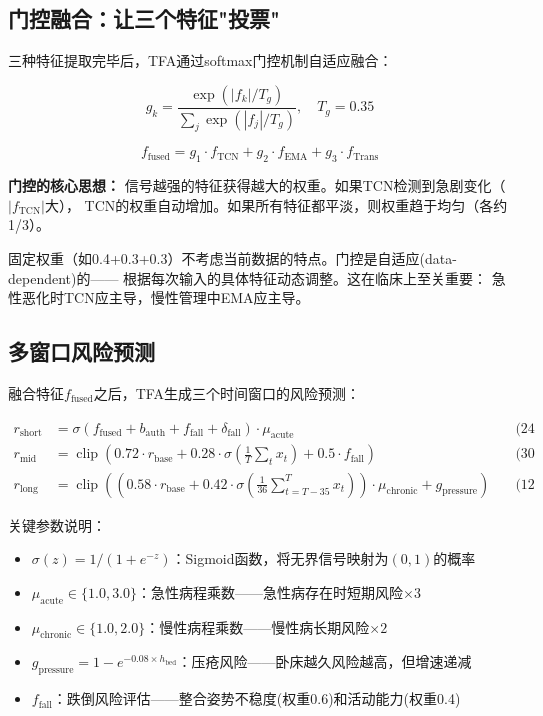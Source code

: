 \documentclass[11pt,a4paper]{ctexart}
\DeclareMathOperator{\clip}{clip}
\begin{document}
\subsection{门控融合：让三个特征"投票"}

三种特征提取完毕后，TFA通过softmax门控机制自适应融合：

$$g_k = \frac{\exp(|f_k| / T_g)}{\sum_j \exp(|f_j| / T_g)}, \quad T_g = 0.35$$

$$f_{\text{fused}} = g_1 \cdot f_{\text{TCN}} + g_2 \cdot f_{\text{EMA}} + g_3 \cdot f_{\text{Trans}}$$

\textbf{门控的核心思想：} 信号越强的特征获得越大的权重。如果TCN检测到急剧变化（$|f_{\text{TCN}}|$大），
TCN的权重自动增加。如果所有特征都平淡，则权重趋于均匀（各约1/3）。

\begin{keybox}[门控 vs 固定权重]
固定权重（如0.4+0.3+0.3）不考虑当前数据的特点。门控是自适应(data-dependent)的——
根据每次输入的具体特征动态调整。这在临床上至关重要：
急性恶化时TCN应主导，慢性管理中EMA应主导。
\end{keybox}

\subsection{多窗口风险预测}

融合特征$f_{\text{fused}}$之后，TFA生成三个时间窗口的风险预测：

\begin{align}
r_{\text{short}} &= \sigma\left(f_{\text{fused}} + b_{\text{auth}} + f_{\text{fall}} + \delta_{\text{fall}}\right) \cdot \mu_{\text{acute}} \quad &\text{(24小时)} \\
r_{\text{mid}} &= \clip\left(0.72 \cdot r_{\text{base}} + 0.28 \cdot \sigma\left(\frac{1}{T}\sum_t x_t\right) + 0.5 \cdot f_{\text{fall}}\right) \quad &\text{(30天)} \\
r_{\text{long}} &= \clip\left(\left(0.58 \cdot r_{\text{base}} + 0.42 \cdot \sigma\left(\frac{1}{36}\sum_{t=T-35}^T x_t\right)\right) \cdot \mu_{\text{chronic}} + g_{\text{pressure}}\right) \quad &\text{(12个月)}
\end{align}

关键参数说明：
\begin{itemize}[nosep]
\item $\sigma(z) = 1/(1+e^{-z})$：Sigmoid函数，将无界信号映射为$(0,1)$的概率
\item $\mu_{\text{acute}} \in \{1.0, 3.0\}$：急性病程乘数——急性病存在时短期风险$\times 3$
\item $\mu_{\text{chronic}} \in \{1.0, 2.0\}$：慢性病程乘数——慢性病长期风险$\times 2$
\item $g_{\text{pressure}} = 1 - e^{-0.08 \times h_{\text{bed}}}$：压疮风险——卧床越久风险越高，但增速递减
\item $f_{\text{fall}}$：跌倒风险评估——整合姿势不稳度(权重0.6)和活动能力(权重0.4)
\end{itemize}
\end{document}

